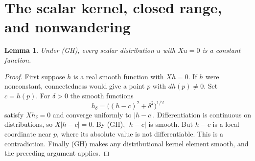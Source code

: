 \documentclass[11pt]{article}
\newtheorem{lemma}[theorem]{Lemma}
\theoremstyle{definition}
\theoremstyle{remark}
\begin{document}

\section{The scalar kernel, closed range, and nonwandering}
\label{sec:regularity}

\begin{lemma}\label{lem:kernel}
Under (GH), every scalar distribution $u$ with $Xu=0$ is a constant function.
\end{lemma}
\begin{proof}
First suppose $h$ is a real smooth function with $Xh=0$. If $h$ were nonconstant, connectedness would give a point $p$ with $dh(p)\ne0$. Set $c=h(p)$. For $\delta>0$ the smooth functions
\[
 h_\delta=\big((h-c)^2+\delta^2\big)^{1/2}
\]
satisfy $Xh_\delta=0$ and converge uniformly to $|h-c|$. Differentiation is continuous on distributions, so $X|h-c|=0$. By (GH), $|h-c|$ is smooth. But $h-c$ is a local coordinate near $p$, where its absolute value is not differentiable. This is a contradiction. Finally (GH) makes any distributional kernel element smooth, and the preceding argument applies.
\end{proof}
\end{document}
